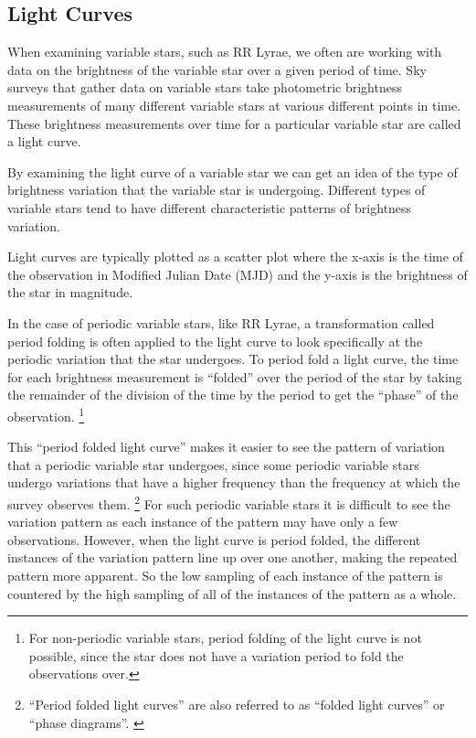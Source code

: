 \documentclass[]{article}
\begin{document}
\subsection{Light Curves}

When examining variable stars, such as RR Lyrae, we often are working with data on the brightness of the variable star over a given period of time. Sky surveys that gather data on variable stars take photometric brightness measurements of many different variable stars at various different points in time. These brightness measurements over time for a particular variable star are called a light curve. \cite{AAVSO_nodate}

By examining the light curve of a variable star we can get an idea of the type of brightness variation that the variable star is undergoing. Different types of variable stars tend to have different characteristic patterns of brightness variation. \cite{sokolovsky_2017}

Light curves are typically plotted as a scatter plot where the x-axis is the time of the observation in Modified Julian Date (MJD) and the y-axis is the brightness of the star in magnitude. \cite{AAVSO_nodate}

In the case of periodic variable stars, like RR Lyrae, a transformation called period folding is often applied to the light curve to look specifically at the periodic variation that the star undergoes. To period fold a light curve, the time for each brightness measurement is ``folded'' over the period of the star by taking the remainder of the division of the time by the period to get the ``phase'' of the observation. \footnote{For non-periodic variable stars, period folding of the light curve is not possible, since the star does not have a variation period to fold the observations over.} \cite{AAVSO_nodate}

This ``period folded light curve'' makes it easier to see the pattern of variation that a periodic variable star undergoes, since some periodic variable stars undergo variations that have a higher frequency than the frequency at which the survey observes them. \footnote{``Period folded light curves'' are also referred to as ``folded light curves'' or ``phase diagrams''. \cite{AAVSO_nodate}} For such periodic variable stars it is difficult to see the variation pattern as each instance of the pattern may have only a few observations. However, when the light curve is period folded, the different instances of the variation pattern line up over one another, making the repeated pattern more apparent. So the low sampling of each instance of the pattern is countered by the high sampling of all of the instances of the pattern as a whole. \cite{AAVSO_nodate}
\end{document}
